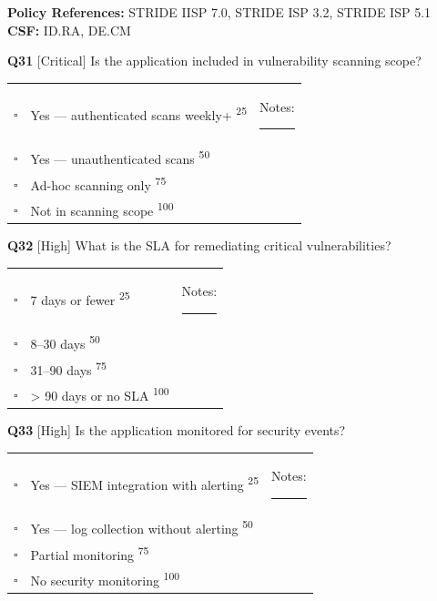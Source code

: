 \documentclass[11pt,landscape]{article}
\begin{document}
\textbf{Policy References:} STRIDE IISP 7.0, STRIDE ISP 3.2, STRIDE ISP 5.1 \hfill \textbf{CSF:} ID.RA, DE.CM

\noindent\colorbox{critbg}{\textbf{Q31} [Critical]} Is the application included in vulnerability scanning scope?

\begin{tabularx}{\textwidth}{cXX}
$\square$ & Yes --- authenticated scans weekly+ \textsuperscript{\scriptsize\textcolor{stridegray}{25}} & Notes: \rule{4cm}{0.4pt} \\
$\square$ & Yes --- unauthenticated scans \textsuperscript{\scriptsize\textcolor{stridegray}{50}} &  \\
$\square$ & Ad-hoc scanning only \textsuperscript{\scriptsize\textcolor{stridegray}{75}} &  \\
$\square$ & Not in scanning scope \textsuperscript{\scriptsize\textcolor{stridegray}{100}} &  \\
\end{tabularx}

\vspace{0.3cm}

\noindent\colorbox{highbg}{\textbf{Q32} [High]} What is the SLA for remediating critical vulnerabilities?

\begin{tabularx}{\textwidth}{cXX}
$\square$ & 7 days or fewer \textsuperscript{\scriptsize\textcolor{stridegray}{25}} & Notes: \rule{4cm}{0.4pt} \\
$\square$ & 8--30 days \textsuperscript{\scriptsize\textcolor{stridegray}{50}} &  \\
$\square$ & 31--90 days \textsuperscript{\scriptsize\textcolor{stridegray}{75}} &  \\
$\square$ & > 90 days or no SLA \textsuperscript{\scriptsize\textcolor{stridegray}{100}} &  \\
\end{tabularx}

\vspace{0.3cm}

\noindent\colorbox{highbg}{\textbf{Q33} [High]} Is the application monitored for security events?

\begin{tabularx}{\textwidth}{cXX}
$\square$ & Yes --- SIEM integration with alerting \textsuperscript{\scriptsize\textcolor{stridegray}{25}} & Notes: \rule{4cm}{0.4pt} \\
$\square$ & Yes --- log collection without alerting \textsuperscript{\scriptsize\textcolor{stridegray}{50}} &  \\
$\square$ & Partial monitoring \textsuperscript{\scriptsize\textcolor{stridegray}{75}} &  \\
$\square$ & No security monitoring \textsuperscript{\scriptsize\textcolor{stridegray}{100}} &  \\
\end{tabularx}
\end{document}
